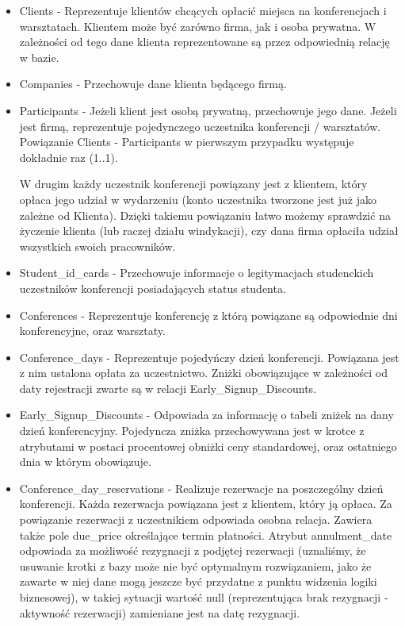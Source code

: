 \documentclass{article}
\begin{document}
        \begin{itemize}
            \item Clients - Reprezentuje klientów chcących opłacić miejsca na konferencjach i warsztatach. Klientem może być zarówno firma, jak i osoba prywatna. W zależności od tego dane klienta reprezentowane są przez odpowiednią relację w bazie. 
            
            \item Companies - Przechowuje dane klienta będącego firmą. 
            
            \item Participants - Jeżeli klient jest osobą prywatną, przechowuje jego dane. Jeżeli jest firmą, reprezentuje pojedynczego uczestnika konferencji / warsztatów. \\
            Powiązanie Clients - Participants w pierwszym przypadku występuje dokładnie raz (1..1). 
            
            W drugim każdy uczestnik konferencji powiązany jest z klientem, który opłaca jego udział w wydarzeniu (konto uczestnika tworzone jest już jako zależne od Klienta). Dzięki takiemu powiązaniu łatwo możemy sprawdzić na życzenie klienta (lub raczej działu windykacji), czy dana firma opłaciła udział wszystkich swoich pracowników. 
            
            \item Student\_id\_cards - Przechowuje informacje o legitymacjach studenckich uczestników konferencji posiadających status studenta. 
            
            \item Conferences - Reprezentuje konferencję z którą powiązane są odpowiednie dni konferencyjne, oraz warsztaty. 
            
            \item Conference\_days - Reprezentuje pojedyńczy dzień konferencji. Powiązana jest z nim ustalona opłata za uczestnictwo. Zniżki obowiązujące w zależności od daty rejestracji zwarte są w relacji Early\_Signup\_Discounts. 
            
            \item Early\_Signup\_Discounts - Odpowiada za informację o tabeli zniżek na dany dzień konferencyjny. Pojedyncza zniżka przechowywana jest w krotce z atrybutami w postaci procentowej obniżki ceny standardowej, oraz ostatniego dnia w którym obowiązuje. 
            
            \item Conference\_day\_reservations - Realizuje rezerwacje na poszczególny dzień konferencji. Każda rezerwacja powiązana jest z klientem, który ją opłaca. Za powiązanie rezerwacji z uczestnikiem odpowiada osobna relacja. Zawiera także pole due\_price określające termin płatności. Atrybut annulment\_date odpowiada za możliwość rezygnacji z podjętej rezerwacji (uznaliśmy, że usuwanie krotki z bazy może nie być optymalnym rozwiązaniem, jako że zawarte w niej dane mogą jeszcze być przydatne z punktu widzenia logiki biznesowej), w takiej sytuacji wartość null (reprezentująca brak rezygnacji - aktywność rezerwacji) zamieniane jest na datę rezygnacji. 
            

\end{itemize}
\end{document}
